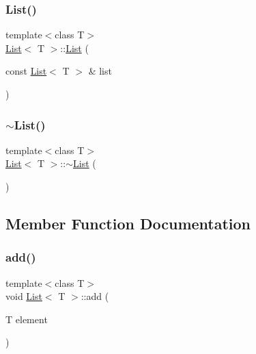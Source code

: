 \mbox{\label{class_list_a296c8387f6c9c0292db7bb19f7e923ac}} 
\subsubsection{\texorpdfstring{List()}{List()}\hspace{0.1cm}{\footnotesize\ttfamily [2/2]}}
{\footnotesize\ttfamily template$<$class T$>$ \\
\hyperlink{class_list}{List}$<$ T $>$\+::\hyperlink{class_list}{List} (\begin{DoxyParamCaption}\item[{const \hyperlink{class_list}{List}$<$ T $>$ \&}]{list }\end{DoxyParamCaption})\hspace{0.3cm}{\ttfamily [inline]}}

\mbox{\label{class_list_a2b58189090f6e5ce52939c9195e59e85}} 
\subsubsection{\texorpdfstring{$\sim$\+List()}{~List()}}
{\footnotesize\ttfamily template$<$class T$>$ \\
\hyperlink{class_list}{List}$<$ T $>$\+::$\sim$\hyperlink{class_list}{List} (\begin{DoxyParamCaption}{ }\end{DoxyParamCaption})\hspace{0.3cm}{\ttfamily [inline]}}



\subsection{Member Function Documentation}
\mbox{\label{class_list_acfdf6d32029662866a5aeb2c9c44bab8}} 
\subsubsection{\texorpdfstring{add()}{add()}}
{\footnotesize\ttfamily template$<$class T$>$ \\
void \hyperlink{class_list}{List}$<$ T $>$\+::add (\begin{DoxyParamCaption}\item[{T}]{element }\end{DoxyParamCaption})\hspace{0.3cm}{\ttfamily [inline]}}

